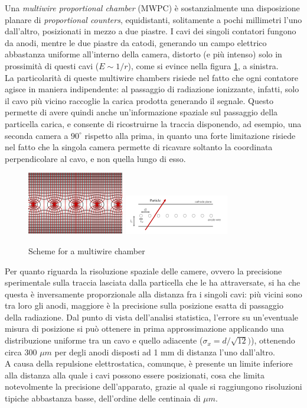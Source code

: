 \documentclass[a4paper,11pt]{book}
\begin{document}
Una 	\textit{multiwire proportional chamber} (MWPC) è sostanzialmente una disposizione planare di \textit{proportional counters}, equidistanti, solitamente a pochi millimetri l'uno dall'altro, posizionati in mezzo a due piastre.  I cavi dei singoli contatori fungono da anodi, mentre le due piastre da catodi, generando un campo elettrico abbastanza uniforme all'interno della camera, distorto (e più intenso) solo in prossimità di questi cavi ($E \sim 1/r$), come si evince nella figura \ref{fig:multiwire_scheme}, a sinistra.\\
La particolarità di queste multiwire chambers risiede nel fatto che ogni contatore agisce in maniera indipendente: al passaggio di radiazione ionizzante, infatti, solo il cavo più vicino raccoglie la carica prodotta generando il segnale. Questo permette di avere quindi anche un'informazione spaziale sul passaggio della particella carica, e consente di ricostruirne la traccia disponendo, ad esempio, una seconda camera a $90^\circ$ rispetto alla prima, in quanto una forte limitazione risiede nel fatto che la singola camera permette di ricavare soltanto la coordinata perpendicolare al cavo, e non quella lungo di esso.\\

\begin{figure}[hbtp]
\centering
\includegraphics[scale = 2]{pictures/MWPC_electric_field.pdf} \qquad\qquad
\includegraphics[scale=3]{pictures/multiwire.pdf}
\caption{Scheme for a multiwire chamber}
\label{fig:multiwire_scheme}
\end{figure}

Per quanto riguarda la risoluzione spaziale delle camere, ovvero la precisione sperimentale sulla traccia lasciata dalla particella che le ha attraversate, si ha che questa è inversamente proporzionale alla distanza fra i singoli cavi: più vicini sono tra loro gli anodi, maggiore è la precisione sulla posizione esatta di passaggio della radiazione. Dal punto di vista dell'analisi statistica, l'errore su un'eventuale misura di posizione si può ottenere in prima approssimazione applicando una distribuzione uniforme tra un cavo e quello adiacente ($\sigma_x = d/\sqrt{12})$), ottenendo circa 300 $\mu m$ per degli anodi disposti ad 1 mm di distanza l'uno dall'altro.\\
 A causa della repulsione elettrostatica, comunque, è presente un limite inferiore alla distanza alla quale i cavi possono essere posizionati, cosa che limita notevolmente la precisione dell'apparato, grazie al quale si raggiungono risoluzioni tipiche abbastanza basse, dell'ordine delle centinaia di $\mu m$.\\
\end{document}
